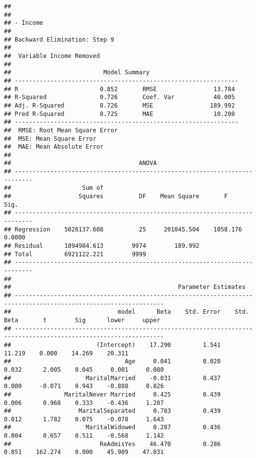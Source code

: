 \documentclass[
]{article}
\begin{document}
\begin{verbatim}
## 
## 
## - Income 
## 
## Backward Elimination: Step 9 
## 
##  Variable Income Removed 
## 
##                          Model Summary                          
## ---------------------------------------------------------------
## R                       0.852       RMSE                13.784 
## R-Squared               0.726       Coef. Var           40.005 
## Adj. R-Squared          0.726       MSE                189.992 
## Pred R-Squared          0.725       MAE                 10.208 
## ---------------------------------------------------------------
##  RMSE: Root Mean Square Error 
##  MSE: Mean Square Error 
##  MAE: Mean Absolute Error 
## 
##                                    ANOVA                                    
## ---------------------------------------------------------------------------
##                    Sum of                                                  
##                   Squares          DF    Mean Square       F          Sig. 
## ---------------------------------------------------------------------------
## Regression    5026137.608          25     201045.504    1058.176    0.0000 
## Residual      1894984.613        9974        189.992                       
## Total         6921122.221        9999                                      
## ---------------------------------------------------------------------------
## 
##                                               Parameter Estimates                                                
## ----------------------------------------------------------------------------------------------------------------
##                              model      Beta    Std. Error    Std. Beta       t        Sig      lower     upper 
## ----------------------------------------------------------------------------------------------------------------
##                        (Intercept)    17.290         1.541                  11.219    0.000    14.269    20.311 
##                                Age     0.041         0.020        0.032      2.005    0.045     0.001     0.080 
##                     MaritalMarried    -0.031         0.437        0.000     -0.071    0.943    -0.888     0.826 
##               MaritalNever Married     0.425         0.439        0.006      0.968    0.333    -0.436     1.287 
##                   MaritalSeparated     0.783         0.439        0.012      1.782    0.075    -0.078     1.643 
##                     MaritalWidowed     0.287         0.436        0.004      0.657    0.511    -0.568     1.142 
##                         ReAdmisYes    46.470         0.286        0.851    162.274    0.000    45.909    47.031 

\end{verbatim}
\end{document}
